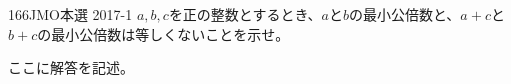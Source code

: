 \begin{prob}{166}{}{JMO本選 2017-1}
 $a, b, c$を正の整数とするとき、$a$と$b$の最小公倍数と、$a+c$と$b+c$の最小公倍数は等しくないことを示せ。
\end{prob}
ここに解答を記述。